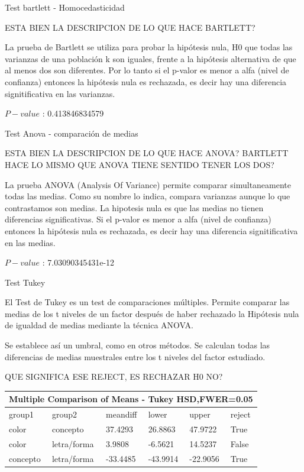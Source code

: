 \documentclass{beamer}
\begin{document}
\begin{frame}{Test bartlett - Homocedasticidad}

{\Large ESTA BIEN LA DESCRIPCION DE LO QUE HACE BARTLETT?}

La prueba de Bartlett se utiliza para probar la hipótesis nula, H0 que todas las varianzas de una población k son iguales, frente a la hipótesis alternativa de que al menos dos son diferentes.
Por lo tanto si el p-valor es menor a alfa (nivel de confianza) entonces la hipótesis nula es rechazada, es decir hay una diferencia signitificativa en las varianzas.

$P-value$ : 0.413846834579

\end{frame}

\begin{frame}{Test Anova - comparación de medias}

{\Large ESTA BIEN LA DESCRIPCION DE LO QUE HACE ANOVA?}
{\Large BARTLETT HACE LO MISMO QUE ANOVA TIENE SENTIDO TENER LOS DOS?}

La prueba ANOVA (Analysis Of Variance) permite comparar simultaneamente todas las medias. Como su nombre lo indica, compara varianzas aunque lo que contrastamos son medias. La hipotesis nula es que las medias no tienen diferencias significativas.
Si el p-valor es menor a alfa (nivel de confianza) entonces la hipótesis nula es rechazada, es decir hay una diferencia signitificativa en las medias.

$P-value$ : 7.03090345431e-12

\end{frame}

\begin{frame}{Test Tukey}

El Test de Tukey es un test de comparaciones múltiples. Permite comparar las medias de los t niveles de un factor después de haber rechazado la Hipótesis nula de igualdad de medias mediante la técnica ANOVA. 

Se establece así un umbral, como en otros métodos. Se calculan todas las diferencias de medias muestrales entre los t niveles del factor estudiado. 

{\Large QUE SIGNIFICA ESE REJECT, ES RECHAZAR H0 NO?}


\begin{center}
    \begin{tabular}{ | p{1.7cm} | p{1.7cm} | p{1.4cm} | p{1.4cm} | p{1.4cm} | p{0.9cm} |}
    \hline
	 \multicolumn{6}{|c|}{Multiple Comparison of Means - Tukey HSD,FWER=0.05 } \\
    \hline
     group1       &  group2      & meandiff & lower    & upper    & reject \\ 
     color        &  concepto    & 37.4293  & 26.8863   &  47.9722 & True   \\ 
     color        &  letra/forma & 3.9808   & -6.5621   &  14.5237 & False  \\ 
	 concepto     &  letra/forma & -33.4485 & -43.9914 &  -22.9056  & True  \\ 
    \hline
    \end{tabular}
\end{center} 

\end{frame}
\end{document}
